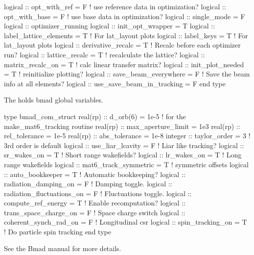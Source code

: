 {\begin{example}
  logical :: opt_with_ref = F          ! use reference data in optimization?
  logical :: opt_with_base = F         ! use base data in optimization?
  logical :: single_mode = F
  logical :: optimizer_running 
  logical :: init_opt_wrapper = T
  logical :: label_lattice_elements = T ! For lat_layout plots
  logical :: label_keys = T             ! For lat_layout plots
  logical :: derivative_recalc = T      ! Recalc before each optimizer run?
  logical :: lattice_recalc = T         ! recalculate the lattice?
  logical :: matrix_recalc_on = T       ! calc linear transfer matrix?  
  logical :: init_plot_needed = T       ! reinitialize plotting?
  logical :: save_beam_everywhere = F   ! Save the beam info at all elements?
  logical :: use_save_beam_in_tracking = F
end type
\end{example}

The  holds bmad global variables. 
\begin{example}
  type bmad_com_struct
    real(rp) :: d_orb(6) = 1e-5  ! for the make_mat6_tracking routine
    real(rp) :: max_aperture_limit = 1e3    
    real(rp) :: rel_tolerance = 1e-5
    real(rp) :: abs_tolerance = 1e-8
    integer :: taylor_order = 3               ! 3rd order is default
    logical :: use_liar_lcavity = F           ! Liar like tracking?
    logical :: sr_wakes_on = T                ! Short range wakefields?
    logical :: lr_wakes_on = T                ! Long range wakefields
    logical :: mat6_track_symmetric = T       ! symmetric offsets
    logical :: auto_bookkeeper = T            ! Automatic bookkeeping?
    logical :: radiation_damping_on = F       ! Damping toggle.
    logical :: radiation_fluctuations_on = F  ! Fluctuations toggle.
    logical :: compute_ref_energy = T         ! Enable recomputation?
    logical :: trans_space_charge_on = F      ! Space charge switch
    logical :: coherent_synch_rad_on = F      ! Longitudinal csr 
    logical :: spin_tracking_on = T           ! Do particle spin tracking
  end type
\end{example}
See the Bmad manual for more details.

}

